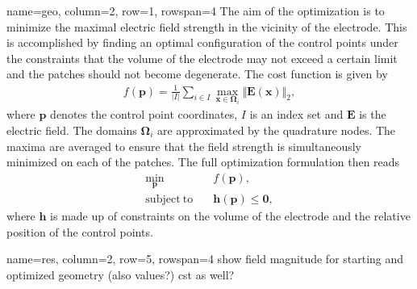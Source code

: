 \documentclass[
   accentcolor=9b,
   boxstyle=boxed
   ]{tudasciposter}
\begin{document}
\begin{tcbposter}[poster={columns=2, rows=8, spacing=1cm}]
\begin{posterboxenv}[title=Geometry Optimization]{name=geo, column=2, row=1, rowspan=4}
   The aim of the optimization is to minimize the maximal electric field strength in the vicinity of the electrode. This is accomplished by finding an optimal configuration of the control points under the constraints that the volume of the electrode may not exceed a certain limit and the patches should not become degenerate.
   The cost function is given by
   \begin{align*}
      f(\mathbf{p}) = \frac{1}{|I|} \sum_{i \in I} \max_{\mathbf{x} \in \boldsymbol{\Omega}_i} \Vert \mathbf{E}(\mathbf{x}) \Vert_2,
   \end{align*}
   where $\mathbf{p}$ denotes the control point coordinates, $I$ is an index set and $\mathbf{E}$ is the electric field. The domains $\boldsymbol{\Omega}_i$ are approximated by the quadrature nodes. The maxima are averaged to ensure that the field strength is simultaneously minimized on each of the patches.
   The full optimization formulation then reads
   \begin{align*}
      \min_\mathbf{p}& \quad f(\mathbf{p}),\\
      \mathrm{subject\ to}& \quad \mathbf{h}(\mathbf{p}) \leq \mathbf{0},
   \end{align*}
   where $\mathbf{h}$ is made up of constraints on the volume of the electrode and the relative position of the control points.

   \begin{center}
      
   \end{center}
\end{posterboxenv}


\begin{posterboxenv}[title=Results]{name=res, column=2, row=5, rowspan=4}
   show field magnitude for starting and optimized geometry (also values?)
   cst as well?

   \begin{center}
      
   \end{center}

   \begin{center}
      
   \end{center}

\end{posterboxenv}

\end{tcbposter}
\end{document}
